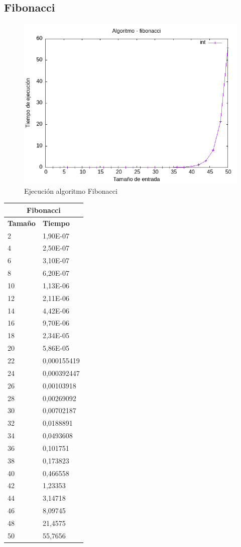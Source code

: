 \documentclass[11pt]{article}
\begin{document}
\subsection*{Fibonacci}
\begin{figure}[H]
    \centering
        \includegraphics[width=0.5\linewidth]{assets/Img/fibonacciint.png}
        \caption{Ejecución algoritmo Fibonacci}
        \label{fig:fibonacci}
\end{figure}
\begin{table}[!ht]
    \centering
    \small
    \begin{tabular}{|l|l|}
    \hline
        \multicolumn{2}{|c|}{\cellcolor{blue!20}Fibonacci} \\ \hline
        \textbf{Tamaño} & \textbf{Tiempo} \\ \hline
        2 & 1,90E-07 \\ \hline
        4 & 2,50E-07 \\ \hline
        6 & 3,10E-07 \\ \hline
        8 & 6,20E-07 \\ \hline
        10 & 1,13E-06 \\ \hline
        12 & 2,11E-06 \\ \hline
        14 & 4,42E-06 \\ \hline
        16 & 9,70E-06 \\ \hline
        18 & 2,34E-05 \\ \hline
        20 & 5,86E-05 \\ \hline
        22 & 0,000155419 \\ \hline
        24 & 0,000392447 \\ \hline
        26 & 0,00103918 \\ \hline
        28 & 0,00269092 \\ \hline
        30 & 0,00702187 \\ \hline
        32 & 0,0188891 \\ \hline
        34 & 0,0493608 \\ \hline
        36 & 0,101751 \\ \hline
        38 & 0,173823 \\ \hline
        40 & 0,466558 \\ \hline
        42 & 1,23353 \\ \hline
        44 & 3,14718 \\ \hline
        46 & 8,09745 \\ \hline
        48 & 21,4575 \\ \hline
        50 & 55,7656 \\ \hline
    \end{tabular}
\end{table}
\end{document}
